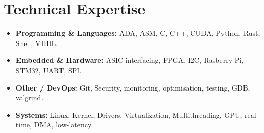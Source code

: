 \documentclass[9pt,a4paper]{article}
\begin{document}
\section*{Technical Expertise}
\begin{tcolorbox}[mybox]
\begin{itemize}
\item \textbf{Programming \& Languages:} ADA, ASM, C, C++, CUDA, Python, Rust, Shell, VHDL.

\item \textbf{Embedded \& Hardware:} ASIC interfacing, FPGA, I2C, Rasberry Pi, STM32, UART, SPI.

\item \textbf{Other / DevOps:} Git, Security, monitoring, optimisation, testing, GDB, valgrind.

\item \textbf{Systems:} Linux, Kernel, Drivers, Virtualization, Multithreading, GPU, real-time, DMA, low-latency.
\end{itemize}
\end{tcolorbox}
\end{document}
